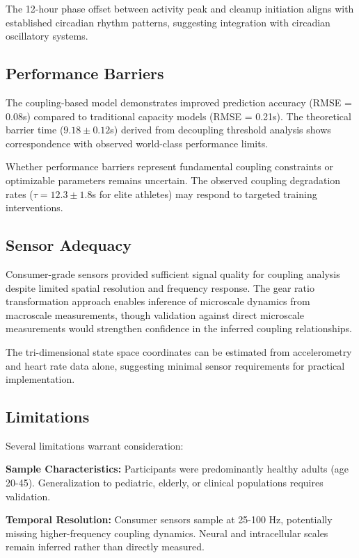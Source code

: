 \documentclass[12pt,twocolumn]{article}
\begin{document}
The 12-hour phase offset between activity peak and cleanup initiation aligns with established circadian rhythm patterns, suggesting integration with circadian oscillatory systems.

\subsection{Performance Barriers}

The coupling-based model demonstrates improved prediction accuracy (RMSE = 0.08s) compared to traditional capacity models (RMSE = 0.21s). The theoretical barrier time ($9.18 \pm 0.12$s) derived from decoupling threshold analysis shows correspondence with observed world-class performance limits.

Whether performance barriers represent fundamental coupling constraints or optimizable parameters remains uncertain. The observed coupling degradation rates ($\tau = 12.3 \pm 1.8$s for elite athletes) may respond to targeted training interventions.

\subsection{Sensor Adequacy}

Consumer-grade sensors provided sufficient signal quality for coupling analysis despite limited spatial resolution and frequency response. The gear ratio transformation approach enables inference of microscale dynamics from macroscale measurements, though validation against direct microscale measurements would strengthen confidence in the inferred coupling relationships.

The tri-dimensional state space coordinates can be estimated from accelerometry and heart rate data alone, suggesting minimal sensor requirements for practical implementation.

\subsection{Limitations}

Several limitations warrant consideration:

\textbf{Sample Characteristics:} Participants were predominantly healthy adults (age 20-45). Generalization to pediatric, elderly, or clinical populations requires validation.

\textbf{Temporal Resolution:} Consumer sensors sample at 25-100 Hz, potentially missing higher-frequency coupling dynamics. Neural and intracellular scales remain inferred rather than directly measured.
\end{document}
